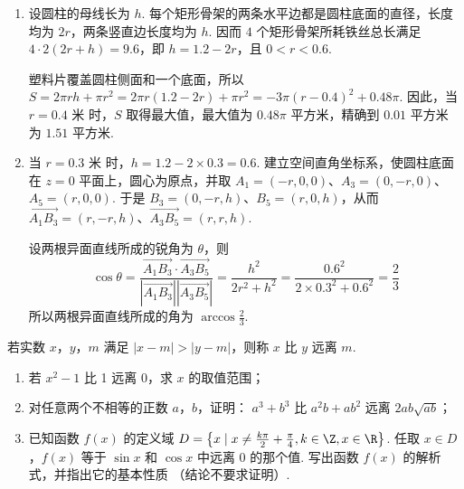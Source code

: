 \begin{solution}
\begin{enumerate}
\item 设圆柱的母线长为 \(h\). 每个矩形骨架的两条水平边都是圆柱底面的直径，长度均为 \(2r\)，两条竖直边长度均为 \(h\). 因而 \(4\) 个矩形骨架所耗铁丝总长满足 \(4\cdot2(2r+h)=9.6\)，即 \(h=1.2-2r\)，且 \(0<r<0.6\).

塑料片覆盖圆柱侧面和一个底面，所以 \(S=2\pi rh+\pi r^2=2\pi r(1.2-2r)+\pi r^2=-3\pi(r-0.4)^2+0.48\pi\). 因此，当 \(r=0.4\text{ 米}\) 时，\(S\) 取得最大值，最大值为 \(0.48\pi\text{ 平方米}\)，精确到 \(0.01\text{ 平方米}\) 为 \(1.51\text{ 平方米}\).

\item 当 \(r=0.3\text{ 米}\) 时，\(h=1.2-2\times0.3=0.6\). 建立空间直角坐标系，使圆柱底面在 \(z=0\) 平面上，圆心为原点，并取 \(A_1=(-r,0,0)\)、\(A_3=(0,-r,0)\)、\(A_5=(r,0,0)\). 于是 \(B_3=(0,-r,h)\)、\(B_5=(r,0,h)\)，从而 \(\overrightarrow{A_1B_3}=(r,-r,h)\)、\(\overrightarrow{A_3B_5}=(r,r,h)\).

设两根异面直线所成的锐角为 \(\theta\)，则
\[
\cos\theta=\frac{\overrightarrow{A_1B_3}\cdot\overrightarrow{A_3B_5}}{\left|\overrightarrow{A_1B_3}\right|\left|\overrightarrow{A_3B_5}\right|}=\frac{h^2}{2r^2+h^2}=\frac{0.6^2}{2\times0.3^2+0.6^2}=\frac{2}{3}
\]
所以两根异面直线所成的角为 \(\arccos\frac{2}{3}\).
\end{enumerate}
\end{solution}

\begin{problem}
若实数 \(x\)，\(y\)，\(m\) 满足 \(|x - m| > |y - m|\)，则称 \(x\) 比 \(y\) 远离 \(m\).

\begin{enumerate}
\item 若 \(x^{2} - 1\) 比 1 远离 0，求 \(x\) 的取值范围；
\item 对任意两个不相等的正数 \(a\)，\(b\)，证明： \(a^3 + b^3\) 比 \(a^2b + ab^2\) 远离 \(2ab\sqrt{ab}\)；
\item 已知函数 \(f(x)\) 的定义域 \(D = \left\{ x \mid x \neq \frac{k\pi}{2} + \frac{\pi}{4}, k \in \Z, x \in \R \right\}\). 任取 \(x \in D\)，\(f(x)\) 等于 \(\sin x\) 和 \(\cos x\) 中远离 \(0\) 的那个值. 写出函数 \(f(x)\) 的解析式，并指出它的基本性质 （结论不要求证明）.
\end{enumerate}
\end{problem}

